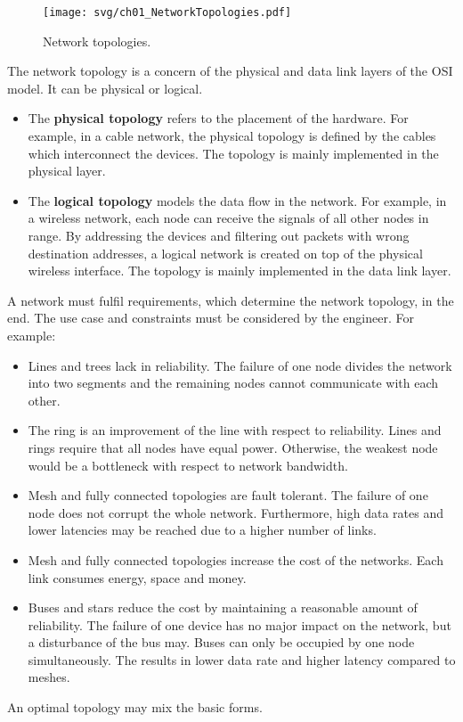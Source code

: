 \begin{refsection}
\begin{figure}[H]
	\centering
	\texttt{[image: svg/ch01\_NetworkTopologies.pdf]}
	\caption{Network topologies. }
\end{figure}

The network topology is a concern of the physical and data link layers of the \ac{OSI} model. It can be physical or logical.
\begin{itemize}
	\item The  \textbf{physical topology} refers to the placement of the hardware. For example, in a cable network, the physical topology is defined by the cables which interconnect the devices. The topology is mainly implemented in the physical layer.
	\item The  \textbf{logical topology} models the data flow in the network. For example, in a wireless network, each node can receive the signals of all other nodes in range. By addressing the devices and filtering out packets with wrong destination addresses, a logical network is created on top of the physical wireless interface. The topology is mainly implemented in the data link layer.
\end{itemize}

A network must fulfil requirements, which determine the network topology, in the end. The use case and constraints must be considered by the engineer. For example:
\begin{itemize}
	\item Lines and trees lack in reliability. The failure of one node divides the network into two segments and the remaining nodes cannot communicate with each other.
	\item The ring is an improvement of the line with respect to reliability. Lines and rings require that all nodes have equal power. Otherwise, the weakest node would be a bottleneck with respect to network bandwidth.
	\item Mesh and fully connected topologies are fault tolerant. The failure of one node does not corrupt the whole network. Furthermore, high data rates and lower latencies may be reached due to a higher number of links.
	\item Mesh and fully connected topologies increase the cost of the networks. Each link consumes energy, space and money.
	\item Buses and stars reduce the cost by maintaining a reasonable amount of reliability. The failure of one device has no major impact on the network, but a disturbance of the bus may. Buses can only be occupied by one node simultaneously. The results in lower data rate and higher latency compared to meshes.
\end{itemize}
An optimal topology may mix the basic forms.

{}
\printbibliography[heading=subbibliography]
\end{refsection}


